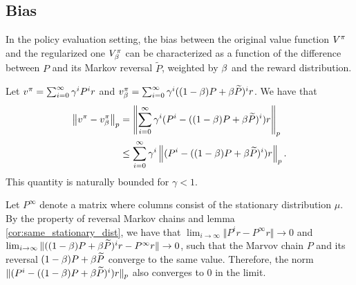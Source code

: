 \subsection{Bias}
In the policy evaluation setting, the bias between the original value function $V^{\pi}$ and the regularized one $V^{\pi}_{\beta}$ can be characterized as a function of the difference between $P$ and its Markov reversal $\widetilde{P}$, weighted by $\beta$ and the reward distribution.

\begin{property}
Let $v^{\pi} = \sum_{i=0}^{\infty} \gamma^i P^i r$ and $v^{\pi}_{\beta} = \sum_{i=0}^{\infty} \gamma^i ((1-\beta) P + \beta \widetilde{P})^i r$. We have that
\begin{equation}
    \begin{split}
        \left\lVert v^{\pi} - v^{\pi}_{\beta}\right\rVert_p &= \left\lVert\sum_{i=0}^{\infty} \gamma^i (P^i-((1-\beta) P + \beta \widetilde{P})^i) r\right\rVert_p \\
        &\leq \sum_{i=0}^{\infty} \gamma^i \left\lVert (P^i-((1-\beta) P + \beta \widetilde{P})^i) r\right\rVert_p.
    \end{split}
\end{equation}
This quantity is naturally bounded for $\gamma < 1$.
\end{property}
\begin{remark}
Let $P^\infty$ denote a matrix where columns consist of the stationary distribution $\mu$.
By the property of reversal Markov chains and lemma \ref{cor:same_stationary_dist}, we have that $\lim_{i\rightarrow\infty} \Vert P^i r-P^\infty r \Vert \rightarrow 0$ and $\lim_{i\rightarrow\infty} \Vert ((1-\beta)P+\beta \widetilde{P})^i r-P^\infty r \Vert \rightarrow 0$, such that the Marvov chain $P$ and its reversal $(1-\beta)P+\beta \widetilde{P}$ converge to the same value. Therefore, the norm $\Vert  (P^i-((1-\beta) P + \beta \widetilde{P})^i) r \Vert_p$ also converges to 0 in the limit.
\end{remark}

